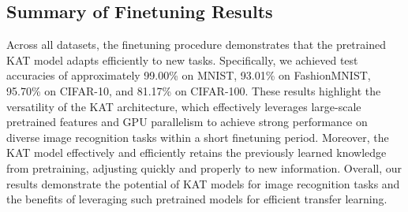 \documentclass[conference]{IEEEtran}
\begin{document}
\subsection{Summary of Finetuning Results}

Across all datasets, the finetuning procedure demonstrates that the pretrained
KAT model adapts efficiently to new tasks. Specifically, we achieved test
accuracies of approximately 99.00\% on MNIST, 93.01\% on FashionMNIST, 95.70\%
on CIFAR-10, and 81.17\% on CIFAR-100. These results highlight the versatility
of the KAT architecture, which effectively leverages large-scale pretrained
features and GPU parallelism to achieve strong performance on diverse image
recognition tasks within a short finetuning period. Moreover, the KAT model
effectively and efficiently retains the previously learned knowledge from
pretraining, adjusting quickly and properly to new information. Overall, our
results demonstrate the potential of KAT models for image recognition tasks and
the benefits of leveraging such pretrained models for efficient transfer
learning.



\end{document}
